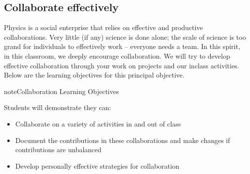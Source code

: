 \documentclass[letterpaper,10pt,english]{jupyterBook}
\begin{document}
\subsection{Collaborate effectively}
\label{\detokenize{content/0_course/goals:collaborate-effectively}}
\sphinxAtStartPar
Physics is a social enterprise that relies on effective and productive collaborations. Very little (if any) science is done alone; the scale of science is too grand for individuals to effectively work – everyone needs a team. In this spirit, in this classroom, we deeply encourage collaboration. We will try to develop effective collaboration through your work on projects and our in\sphinxhyphen{}class activities. Below are the learning objectives for this principal objective.

\begin{sphinxadmonition}{note}{Collaboration Learning Objectives}

\sphinxAtStartPar
Students will demonstrate they can:
\begin{itemize}
\item {} 
\sphinxAtStartPar
Collaborate on a variety of activities in and out of class

\item {} 
\sphinxAtStartPar
Document the contributions in these collaborations and make changes if contributions are unbalanced

\item {} 
\sphinxAtStartPar
Develop personally effective strategies for collaboration

\end{itemize}
\end{sphinxadmonition}

\sphinxstepscope
\end{document}
